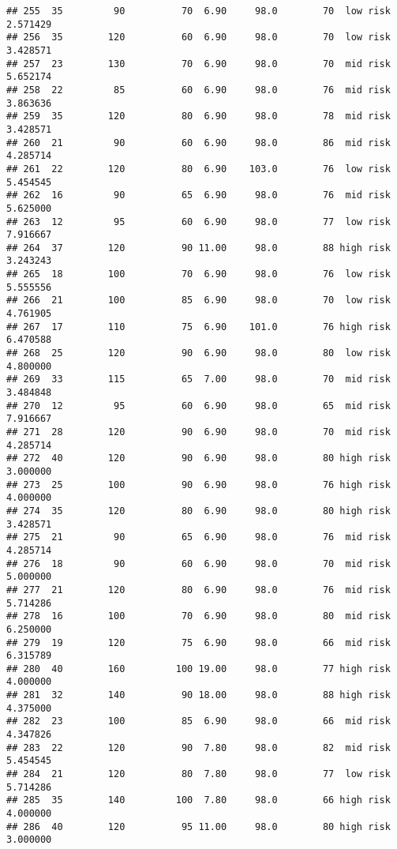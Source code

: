 \documentclass[
  ignorenonframetext,
]{beamer}
\begin{document}
\begin{frame}[fragile]
\begin{verbatim}
## 255  35         90          70  6.90     98.0        70  low risk      2.571429
## 256  35        120          60  6.90     98.0        70  low risk      3.428571
## 257  23        130          70  6.90     98.0        70  mid risk      5.652174
## 258  22         85          60  6.90     98.0        76  mid risk      3.863636
## 259  35        120          80  6.90     98.0        78  mid risk      3.428571
## 260  21         90          60  6.90     98.0        86  mid risk      4.285714
## 261  22        120          80  6.90    103.0        76  low risk      5.454545
## 262  16         90          65  6.90     98.0        76  mid risk      5.625000
## 263  12         95          60  6.90     98.0        77  low risk      7.916667
## 264  37        120          90 11.00     98.0        88 high risk      3.243243
## 265  18        100          70  6.90     98.0        76  low risk      5.555556
## 266  21        100          85  6.90     98.0        70  low risk      4.761905
## 267  17        110          75  6.90    101.0        76 high risk      6.470588
## 268  25        120          90  6.90     98.0        80  low risk      4.800000
## 269  33        115          65  7.00     98.0        70  mid risk      3.484848
## 270  12         95          60  6.90     98.0        65  mid risk      7.916667
## 271  28        120          90  6.90     98.0        70  mid risk      4.285714
## 272  40        120          90  6.90     98.0        80 high risk      3.000000
## 273  25        100          90  6.90     98.0        76 high risk      4.000000
## 274  35        120          80  6.90     98.0        80 high risk      3.428571
## 275  21         90          65  6.90     98.0        76  mid risk      4.285714
## 276  18         90          60  6.90     98.0        70  mid risk      5.000000
## 277  21        120          80  6.90     98.0        76  mid risk      5.714286
## 278  16        100          70  6.90     98.0        80  mid risk      6.250000
## 279  19        120          75  6.90     98.0        66  mid risk      6.315789
## 280  40        160         100 19.00     98.0        77 high risk      4.000000
## 281  32        140          90 18.00     98.0        88 high risk      4.375000
## 282  23        100          85  6.90     98.0        66  mid risk      4.347826
## 283  22        120          90  7.80     98.0        82  mid risk      5.454545
## 284  21        120          80  7.80     98.0        77  low risk      5.714286
## 285  35        140         100  7.80     98.0        66 high risk      4.000000
## 286  40        120          95 11.00     98.0        80 high risk      3.000000

\end{verbatim}
\end{frame}
\end{document}
